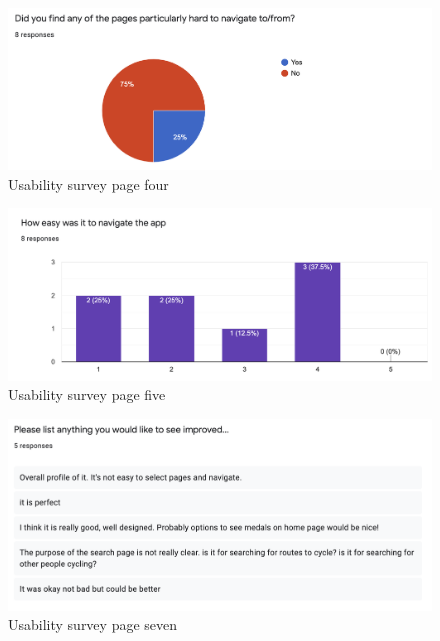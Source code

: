\documentclass{l4proj}
\begin{document}
\begin{appendices}
\begin{figure}[h!]
    \centering
    \includegraphics[scale=0.6]{images/Screenshot 2022-02-17 at 11.17.42 pm.png} 
    \caption{Usability survey page four}
    \label{fig:surveypage4}
\end{figure}

\begin{figure}[h!]
    \centering
    \includegraphics[scale=0.6]{images/Screenshot 2022-02-17 at 11.17.34 pm.png} 
    \caption{Usability survey page five}
    \label{fig:surveypage5}
\end{figure}

\begin{figure}[h!]
    \centering
    \includegraphics[scale=0.6]{images/Screenshot 2022-02-17 at 11.17.50 pm.png} 
    \caption{Usability survey page seven}
    \label{fig:surveypage7}
\end{figure}



\end{appendices}






\end{document}
